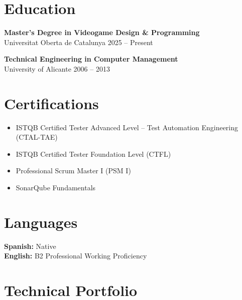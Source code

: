 \documentclass[11pt,a4paper]{article}
\begin{document}

\section*{Education}

\textbf{Master’s Degree in Videogame Design \& Programming} \\
Universitat Oberta de Catalunya \hfill 2025 -- Present

\vspace{0.2cm}

\textbf{Technical Engineering in Computer Management} \\
University of Alicante \hfill 2006 -- 2013


\section*{Certifications}

\begin{itemize}[leftmargin=*]
    \item ISTQB Certified Tester Advanced Level – Test Automation Engineering (CTAL-TAE)
    \item ISTQB Certified Tester Foundation Level (CTFL)
    \item Professional Scrum Master I (PSM I)
    \item SonarQube Fundamentals
\end{itemize}


\section*{Languages}

\textbf{Spanish:} Native \\
\textbf{English:} B2 Professional Working Proficiency



\section*{Technical Portfolio}
\end{document}
